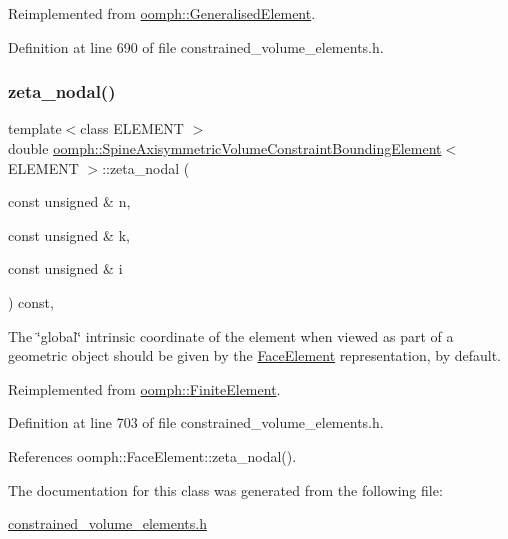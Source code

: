Reimplemented from \hyperlink{classoomph_1_1GeneralisedElement_a6ae09fc0d68e4309ac1b03583d252845}{oomph\+::\+Generalised\+Element}.



Definition at line 690 of file constrained\+\_\+volume\+\_\+elements.\+h.

\mbox{\label{classoomph_1_1SpineAxisymmetricVolumeConstraintBoundingElement_ae15b2d0563f79ea10d23a1286831143a}} 
\subsubsection{\texorpdfstring{zeta\+\_\+nodal()}{zeta\_nodal()}}
{\footnotesize\ttfamily template$<$class E\+L\+E\+M\+E\+NT $>$ \\
double \hyperlink{classoomph_1_1SpineAxisymmetricVolumeConstraintBoundingElement}{oomph\+::\+Spine\+Axisymmetric\+Volume\+Constraint\+Bounding\+Element}$<$ E\+L\+E\+M\+E\+NT $>$\+::zeta\+\_\+nodal (\begin{DoxyParamCaption}\item[{const unsigned \&}]{n,  }\item[{const unsigned \&}]{k,  }\item[{const unsigned \&}]{i }\end{DoxyParamCaption}) const\hspace{0.3cm}{\ttfamily [inline]}, {\ttfamily [virtual]}}



The \char`\"{}global\char`\"{} intrinsic coordinate of the element when viewed as part of a geometric object should be given by the \hyperlink{classoomph_1_1FaceElement}{Face\+Element} representation, by default. 



Reimplemented from \hyperlink{classoomph_1_1FiniteElement_a849561c5fbcbc07dc49d2dc6cca68559}{oomph\+::\+Finite\+Element}.



Definition at line 703 of file constrained\+\_\+volume\+\_\+elements.\+h.



References oomph\+::\+Face\+Element\+::zeta\+\_\+nodal().



The documentation for this class was generated from the following file\+:\begin{DoxyCompactItemize}
\item 
\hyperlink{constrained__volume__elements_8h}{constrained\+\_\+volume\+\_\+elements.\+h}\end{DoxyCompactItemize}
